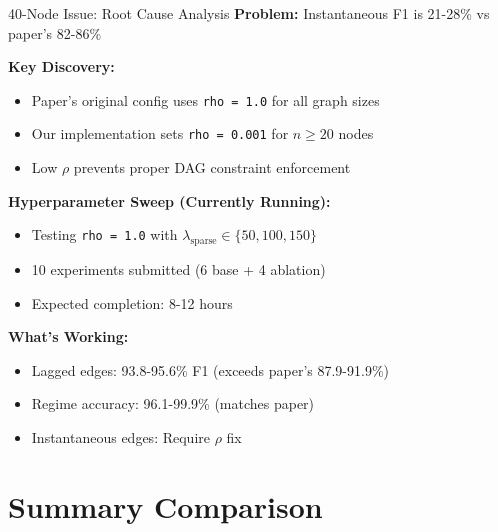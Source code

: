 \documentclass[aspectratio=169]{beamer}
\begin{document}
\begin{frame}{40-Node Issue: Root Cause Analysis}
\textbf{Problem:} Instantaneous F1 is 21-28\% vs paper's 82-86\%

\vspace{0.2cm}
\textbf{Key Discovery:}
\begin{itemize}
    \item Paper's original config uses \texttt{rho = 1.0} for all graph sizes
    \item Our implementation sets \texttt{rho = 0.001} for $n \geq 20$ nodes
    \item Low $\rho$ prevents proper DAG constraint enforcement
\end{itemize}

\vspace{0.2cm}
\textbf{Hyperparameter Sweep (Currently Running):}
\begin{itemize}
    \item Testing \texttt{rho = 1.0} with $\lambda_{\text{sparse}} \in \{50, 100, 150\}$
    \item 10 experiments submitted (6 base + 4 ablation)
    \item Expected completion: 8-12 hours
\end{itemize}

\vspace{0.2cm}
\textbf{What's Working:}
\begin{itemize}
    \item \textcolor{reprogreen}{Lagged edges:} 93.8-95.6\% F1 (exceeds paper's 87.9-91.9\%)
    \item \textcolor{reprogreen}{Regime accuracy:} 96.1-99.9\% (matches paper)
    \item \textcolor{warnred}{Instantaneous edges:} Require $\rho$ fix
\end{itemize}
\end{frame}

\section{Summary Comparison}
\end{document}
